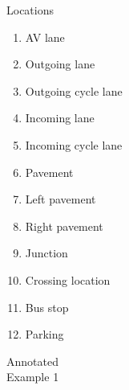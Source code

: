 \documentclass[10pt, aspectratio=169]{beamer}
\begin{document}
\begin{frame}{Locations}
  \begin{multicols}{2}
        \begin{enumerate}
            \setlength\itemsep{1em}
            \item AV lane
            \item Outgoing lane
            \item Outgoing cycle lane
            \item Incoming lane
            \item Incoming cycle lane
            \item Pavement
            \item Left pavement
            \item Right pavement
            \item Junction
            \item Crossing location
            \item Bus stop
            \item Parking
        \end{enumerate}
    \end{multicols}
\end{frame}

{
\begin{frame}{Annotated\\ \hspace{0.7em} Example 1}
\end{frame}
}
\end{document}
